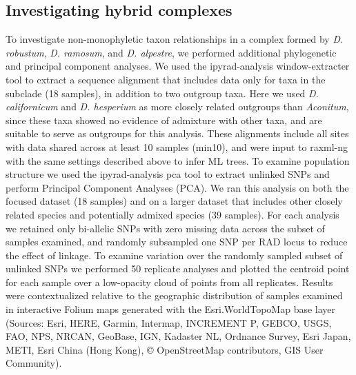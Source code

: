 \documentclass[11pt]{article}
\begin{document}
\subsection{Investigating hybrid complexes}
To investigate non-monophyletic taxon relationships in a complex formed 
by \emph{D. robustum}, \emph{D. ramosum}, and \emph{D. alpestre}, 
we performed additional phylogenetic and principal component analyses.
% 
We used the ipyrad-analysis window-extracter tool to extract a sequence 
alignment that includes data only for taxa in the subclade (18 samples), 
in addition to two outgroup taxa. 
Here we used \emph{D. californicum} and \emph{D. hesperium} as more closely 
related outgroups than \emph{Aconitum}, since these taxa showed no evidence
of admixture with other taxa, and are suitable to serve as outgroups for this analysis.
% 
These alignments include all sites with data shared across at least 10 
samples (min10), and were input to raxml-ng with the same settings described
above to infer ML trees. 
% 
To examine population structure we used the ipyrad-analysis pca tool to 
extract unlinked SNPs and perform Principal Component Analyses (PCA). 
% 
We ran this analysis on both the focused dataset (18 samples) and on a
larger dataset that includes other closely related species and potentially
admixed species (39 samples).
% 
For each analysis we retained only bi-allelic SNPs with zero missing data across
the subset of samples examined, and randomly subsampled one SNP per RAD locus to
reduce the effect of linkage. 
% 
To examine variation over the randomly sampled subset of unlinked SNPs we 
performed 50 replicate analyses and plotted the centroid point for each sample
over a low-opacity cloud of points from all replicates.
% 
Results were contextualized relative to the geographic distribution of 
samples examined in interactive Folium maps generated with the 
Esri.WorldTopoMap base layer (Sources: Esri, HERE, Garmin, Intermap, 
INCREMENT P, GEBCO, USGS, FAO, NPS, NRCAN, GeoBase, IGN, Kadaster NL, 
Ordnance Survey, Esri Japan, METI, Esri China (Hong Kong), © OpenStreetMap 
contributors, GIS User Community).
\end{document}
